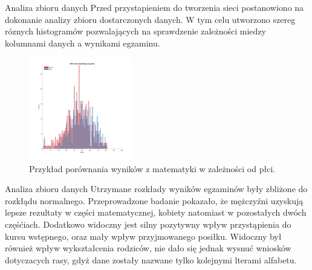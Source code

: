 \documentclass[10pt]{beamer}
\begin{document}
\begin{frame}{Analiza zbioru danych}
Przed przystapieniem do tworzenia sieci postanowiono na dokonanie analizy zbioru dostarczonych danych. W tym celu utworzono szereg róznych histogramów pozwalających na sprawdzenie zależności miedzy kolumnami danych a wynikami egzaminu. 


\begin{figure}[H]
\centering
\includegraphics[width=0.4\textwidth]{../report/static/hist_math_score_per_gender.pdf}
\caption{Przykład porównania wyników z matematyki w zależności od płci.}
\end{figure}
\end{frame}


\begin{frame}{Analiza zbioru danych}
Utrzymane rozkłady wyników egzaminów były zbliżone do rozkłądu normalnego. Przeprowadzone badanie pokazało, że mężczyźni uzyskują lepsze rezultaty w części matematycznej, kobiety natomiast w pozostałych dwóch częśćiach. Dodatkowo widoczny jest silny pozytywny wpływ  przystąpienia do kursu wstępnego, oraz mały wpływ przyjmowanego posiłku. Widoczny był również wpływ wykształcenia rodziców, nie dało się jednak wysnuć wniosków dotyczacych rasy, gdyż dane zostały nazwane tylko kolejnymi lterami alfabetu.
\end{frame}
\end{document}
